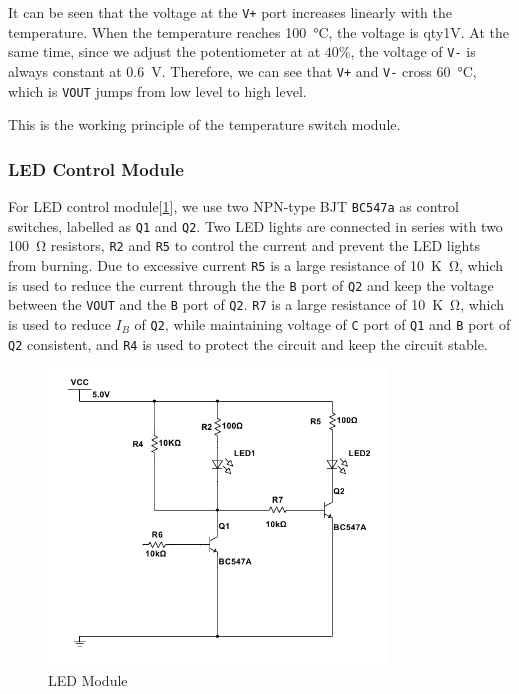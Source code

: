 \documentclass[12pt]{article}
\numberwithin{equation}{section}
\begin{document}
It can be seen that the voltage at the \verb|V+| port increases linearly with the temperature. When the temperature reaches \qty{100}{\degreeCelsius}, the voltage is qty{1}{V}. At the same time, since we adjust the potentiometer at at $40\%$, the voltage of \verb|V-| is always constant at \qty{0.6}{V}. Therefore, we can see that \verb|V+| and \verb|V-| cross \qty{60}{\degreeCelsius}, which is \verb|VOUT| jumps from low level to high level.

This is the working principle of the temperature switch module.



\subsubsection{LED Control Module}


For LED control module[\ref{Fig.LED_module}], we use two NPN-type BJT \verb|BC547a| as control switches, labelled as \verb|Q1| and \verb|Q2|. Two LED lights are connected in series with two \qty{100}{\ohm} resistors, \verb|R2| and \verb|R5| to control the current and prevent the LED lights from burning. Due to excessive current \verb|R5| is a large resistance of \qty{10}{K\ohm}, which is used to reduce the current through the the \verb|B| port of \verb|Q2| and keep the voltage between the \verb|VOUT| and the \verb|B| port of \verb|Q2|. \verb|R7| is a large resistance of \qty{10}{K\ohm}, which is used to reduce $I_B$ of \verb|Q2|, while maintaining voltage of \verb|C| port of \verb|Q1| and \verb|B| port of \verb|Q2| consistent, and \verb|R4| is used to protect the circuit and keep the circuit stable.


\begin{figure}[H] %
\centering %
\includegraphics[width=0.8\textwidth]{LED_module} %
\caption{LED Module} %
\label{Fig.LED_module} %
\end{figure}
\end{document}
